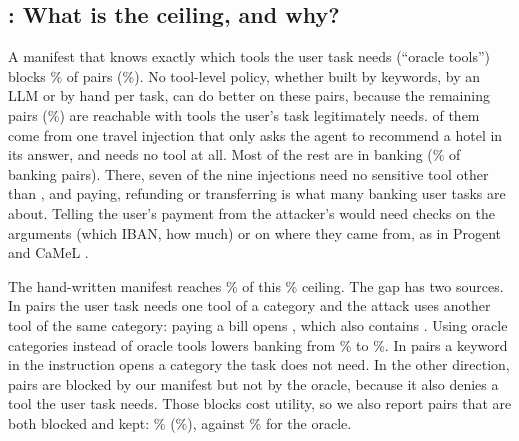 \subsection{: What is the ceiling, and why?}
A manifest that knows exactly which tools the user task needs (``oracle tools'') blocks \% of pairs
(\%). No tool-level policy, whether built by keywords, by an LLM or by hand per task, can do better on
these pairs, because the remaining  pairs (\%) are reachable with tools the user's task
legitimately needs.  of them come from one travel injection that only asks the agent to recommend a hotel
in its answer, and needs no tool at all. Most of the rest are in banking (\% of banking pairs).
There, seven of the nine injections need no sensitive tool other than , and paying, refunding or transferring
is what many banking user tasks are about. Telling the user's payment from the attacker's would need checks on the
arguments (which IBAN, how much) or on where they came from, as in Progent and CaMeL
\cite{shi2025progent,debenedetti2025camel}.

The hand-written manifest reaches \% of this \% ceiling. The gap has two sources. In 
pairs the user task needs one tool of a category and the attack uses another tool of the same category: paying a bill
opens , which also contains . Using oracle categories instead of
oracle tools lowers banking from \% to \%. In  pairs a keyword in the
instruction opens a category the task does not need. In the other direction,  pairs are blocked by our
manifest but not by the oracle, because it also denies a tool the user task needs. Those blocks cost utility, so we
also report pairs that are both blocked and kept: \% (\%), against \% for the
oracle.

